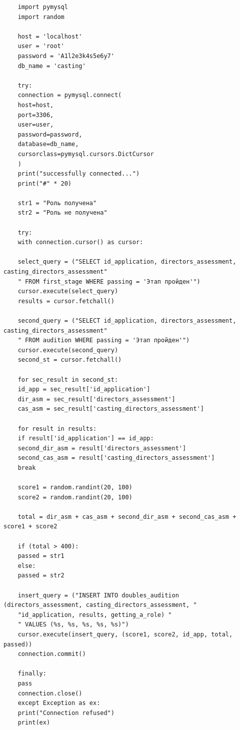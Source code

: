 \documentclass[11pt,a4paper,final]{article} %
\begin{document}
\begin{lstlisting}
	import pymysql
	import random
	
	host = 'localhost'
	user = 'root'
	password = 'A1l2e3k4s5e6y7'
	db_name = 'casting'
	
	try:
	connection = pymysql.connect(
	host=host,
	port=3306,
	user=user,
	password=password,
	database=db_name,
	cursorclass=pymysql.cursors.DictCursor
	)
	print("successfully connected...")
	print("#" * 20)
	
	str1 = "Роль получена"
	str2 = "Роль не получена"
	
	try:
	with connection.cursor() as cursor:
	
	select_query = ("SELECT id_application, directors_assessment, casting_directors_assessment"
	" FROM first_stage WHERE passing = 'Этап пройден'")
	cursor.execute(select_query)
	results = cursor.fetchall()
	
	second_query = ("SELECT id_application, directors_assessment, casting_directors_assessment"
	" FROM audition WHERE passing = 'Этап пройден'")
	cursor.execute(second_query)
	second_st = cursor.fetchall()
	
	for sec_result in second_st:
	id_app = sec_result['id_application']
	dir_asm = sec_result['directors_assessment']
	cas_asm = sec_result['casting_directors_assessment']
	
	for result in results:
	if result['id_application'] == id_app:
	second_dir_asm = result['directors_assessment']
	second_cas_asm = result['casting_directors_assessment']
	break
	
	score1 = random.randint(20, 100)
	score2 = random.randint(20, 100)
	
	total = dir_asm + cas_asm + second_dir_asm + second_cas_asm + score1 + score2
	
	if (total > 400):
	passed = str1
	else:
	passed = str2
	
	insert_query = ("INSERT INTO doubles_audition (directors_assessment, casting_directors_assessment, "
	"id_application, results, getting_a_role) "
	" VALUES (%s, %s, %s, %s, %s)")
	cursor.execute(insert_query, (score1, score2, id_app, total, passed))
	connection.commit()
	
	finally:
	pass
	connection.close()
	except Exception as ex:
	print("Connection refused")
	print(ex)
	
\end{lstlisting} 

	
	
	
	
\end{document}
